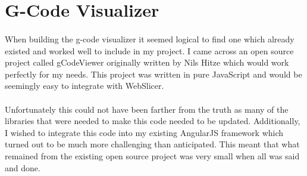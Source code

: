 \section{G-Code Visualizer}
\paragraph{}
When building the g-code visualizer it seemed logical to find one which already existed and worked well to include in my project.
I came across an open source project called gCodeViewer originally written by Nils Hitze which would work perfectly for my needs. \cite{hitzeViewer-2015}
This project was written in pure JavaScript and would be seemingly easy to integrate with WebSlicer.

\paragraph{}
Unfortunately this could not have been farther from the truth as many of the libraries that were needed to make this code needed to be updated.
Additionally, I wished to integrate this code into my existing AngularJS framework which turned out to be much more challenging than anticipated.
This meant that what remained from the existing open source project was very small when all was said and done.

